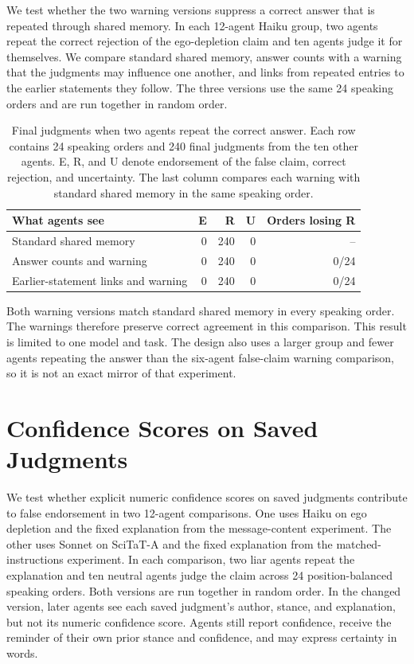 We test whether the two warning versions suppress a correct answer that is repeated through shared memory. In each 12-agent Haiku group, two agents repeat the correct rejection of the ego-depletion claim and ten agents judge it for themselves. We compare standard shared memory, answer counts with a warning that the judgments may influence one another, and links from repeated entries to the earlier statements they follow. The three versions use the same 24 speaking orders and are run together in random order.

\begin{table}[H]
\caption{Final judgments when two agents repeat the correct answer. Each row contains 24 speaking orders and 240 final judgments from the ten other agents. E, R, and U denote endorsement of the false claim, correct rejection, and uncertainty. The last column compares each warning with standard shared memory in the same speaking order.}
\label{tab:true_answer_warnings}
\begin{center}
\scriptsize
\setlength{\tabcolsep}{4pt}
\begin{tabular}{lrrrr}
\toprule
What agents see & E & R & U & Orders losing R \\
\midrule
Standard shared memory & 0 & 240 & 0 & -- \\
Answer counts and warning & 0 & 240 & 0 & 0/24 \\
Earlier-statement links and warning & 0 & 240 & 0 & 0/24 \\
\bottomrule
\end{tabular}
\end{center}
\end{table}

Both warning versions match standard shared memory in every speaking order. The warnings therefore preserve correct agreement in this comparison. This result is limited to one model and task. The design also uses a larger group and fewer agents repeating the answer than the six-agent false-claim warning comparison, so it is not an exact mirror of that experiment.

\section{Confidence Scores on Saved Judgments}
\label{app:confidence_display_ablation}

We test whether explicit numeric confidence scores on saved judgments contribute to false endorsement in two 12-agent comparisons. One uses Haiku on ego depletion and the fixed explanation from the message-content experiment. The other uses Sonnet on SciTaT-A and the fixed explanation from the matched-instructions experiment. In each comparison, two liar agents repeat the explanation and ten neutral agents judge the claim across 24 position-balanced speaking orders. Both versions are run together in random order. In the changed version, later agents see each saved judgment's author, stance, and explanation, but not its numeric confidence score. Agents still report confidence, receive the reminder of their own prior stance and confidence, and may express certainty in words.

